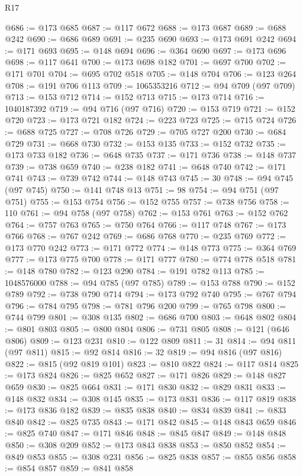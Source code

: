 \begin{lexlean}{R17}
\begin{coremodule}
@686 := @173 @685
@687 := @117 @672
@688 := @173 @687
@689 := @688 @242
@690 := @686 @689
@691 := @235 @690
@693 := @173 @691 @242
@694 := @171 @693
@695 := @148 @694
@696 := @364 @690
@697 := @173 @696
@698 := @117 @641
@700 := @173 @698 @182
@701 := @697 @700
@702 := @171 @701
@704 := @695 @702 @518
@705 := @148 @704
@706 := @123 @264
@708 := @191 @706 @113
@709 := 1065353216
@712 := @94 @709 (@97 @709)
@713 := @153 @712
@714 := @152 @713
@715 := @173 @714
@716 := 1040187392
@719 := @94 @716 (@97 @716)
@720 := @153 @719
@721 := @152 @720
@723 := @173 @721 @182
@724 := @223 @723
@725 := @715 @724
@726 := @688 @725
@727 := @708 @726
@729 := @705 @727 @200
@730 := @684 @729
@731 := @668 @730
@732 := @153 @135
@733 := @152 @732
@735 := @173 @733 @182
@736 := @648 @735
@737 := @171 @736
@738 := @148 @737
@739 := @738 @659
@740 := @238 @182
@741 := @648 @740
@742 := @171 @741
@743 := @739 @742
@744 := @148 @743
@745 := 30
@748 := @94 @745 (@97 @745)
@750 := @141 @748 @13
@751 := 98
@754 := @94 @751 (@97 @751)
@755 := @153 @754
@756 := @152 @755
@757 := @738 @756
@758 := 110
@761 := @94 @758 (@97 @758)
@762 := @153 @761
@763 := @152 @762
@764 := @757 @763
@765 := @750 @764
@766 := @117 @748
@767 := @173 @766
@768 := @767 @242
@769 := @686 @768
@770 := @235 @769
@772 := @173 @770 @242
@773 := @171 @772
@774 := @148 @773
@775 := @364 @769
@777 := @173 @775 @700
@778 := @171 @777
@780 := @774 @778 @518
@781 := @148 @780
@782 := @123 @290
@784 := @191 @782 @113
@785 := 1048576000
@788 := @94 @785 (@97 @785)
@789 := @153 @788
@790 := @152 @789
@792 := @738 @790 @714
@794 := @173 @792 @740
@795 := @767 @794
@796 := @784 @795
@798 := @781 @796 @200
@799 := @765 @798
@800 := @744 @799
@801 := @308 @135
@802 := @686 @700
@803 := @648 @802
@804 := @801 @803
@805 := @800 @804
@806 := @731 @805
@808 := @121 (@646 @806)
@809 := @123 @231
@810 := @122 @809
@811 := 31
@814 := @94 @811 (@97 @811)
@815 := @92 @814
@816 := 32
@819 := @94 @816 (@97 @816)
@822 := @815 (@92 @819 @101)
@823 := @810 @822
@824 := @117 @814
@825 := @173 @824
@826 := @825 @652
@827 := @171 @826
@829 := @148 @827 @659
@830 := @825 @664
@831 := @171 @830
@832 := @829 @831
@833 := @148 @832
@834 := @308 @145
@835 := @173 @831
@836 := @117 @819
@838 := @173 @836 @182
@839 := @835 @838
@840 := @834 @839
@841 := @833 @840
@842 := @825 @735
@843 := @171 @842
@845 := @148 @843 @659
@846 := @825 @740
@847 := @171 @846
@848 := @845 @847
@849 := @148 @848
@850 := @308 @209
@852 := @173 @843 @838
@853 := @850 @852
@854 := @849 @853
@855 := @308 @231
@856 := @825 @838
@857 := @855 @856
@858 := @854 @857
@859 := @841 @858

\end{coremodule}
\end{lexlean}
